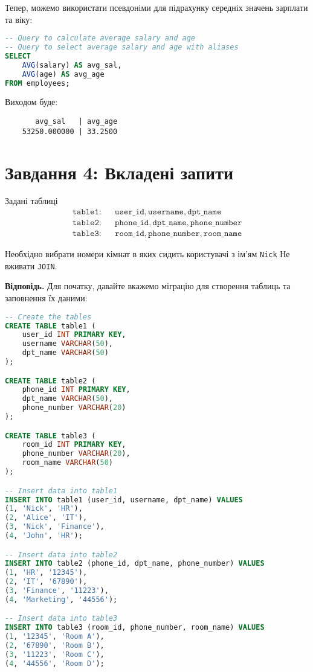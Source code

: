 \documentclass{hw_template}
\begin{document}
Тепер, можемо використати псевдоніми для підрахунку середніх значень зарплати та
віку:
\begin{lstlisting}[language=SQL]
-- Query to calculate average salary and age
-- Query to select average salary and age with aliases
SELECT 
    AVG(salary) AS avg_sal,
    AVG(age) AS avg_age
FROM employees;
\end{lstlisting}

Виходом буде:
\begin{lstlisting}
       avg_sal   | avg_age
    53250.000000 | 33.2500
\end{lstlisting}

\newpage

\section{Завдання 4: Вкладені запити}

\begin{problem}
    Задані таблиці
    \begin{align*}
        \texttt{table1}: && \texttt{user\_id}, \texttt{username}, \texttt{dpt\_name} \\
        \texttt{table2}: && \texttt{phone\_id}, \texttt{dpt\_name}, \texttt{phone\_number} \\
        \texttt{table3}: && \texttt{room\_id}, \texttt{phone\_number}, \texttt{room\_name}
    \end{align*}

    Необхідно вибрати номери кімнат в яких сидить користувачі з ім'ям
    \texttt{Nick} Не вживати \texttt{JOIN}. 
\end{problem}

\textbf{Відповідь.} Для початку, давайте вкажемо міграцію для створення таблиць
та заповнення їх даними:
\begin{lstlisting}[language=SQL]
-- Create the tables
CREATE TABLE table1 (
    user_id INT PRIMARY KEY,
    username VARCHAR(50),
    dpt_name VARCHAR(50)
);

CREATE TABLE table2 (
    phone_id INT PRIMARY KEY,
    dpt_name VARCHAR(50),
    phone_number VARCHAR(20)
);

CREATE TABLE table3 (
    room_id INT PRIMARY KEY,
    phone_number VARCHAR(20),
    room_name VARCHAR(50)
);

-- Insert data into table1
INSERT INTO table1 (user_id, username, dpt_name) VALUES
(1, 'Nick', 'HR'),
(2, 'Alice', 'IT'),
(3, 'Nick', 'Finance'),
(4, 'John', 'HR');

-- Insert data into table2
INSERT INTO table2 (phone_id, dpt_name, phone_number) VALUES
(1, 'HR', '12345'),
(2, 'IT', '67890'),
(3, 'Finance', '11223'),
(4, 'Marketing', '44556');

-- Insert data into table3
INSERT INTO table3 (room_id, phone_number, room_name) VALUES
(1, '12345', 'Room A'),
(2, '67890', 'Room B'),
(3, '11223', 'Room C'),
(4, '44556', 'Room D');
\end{lstlisting}
\end{document}
